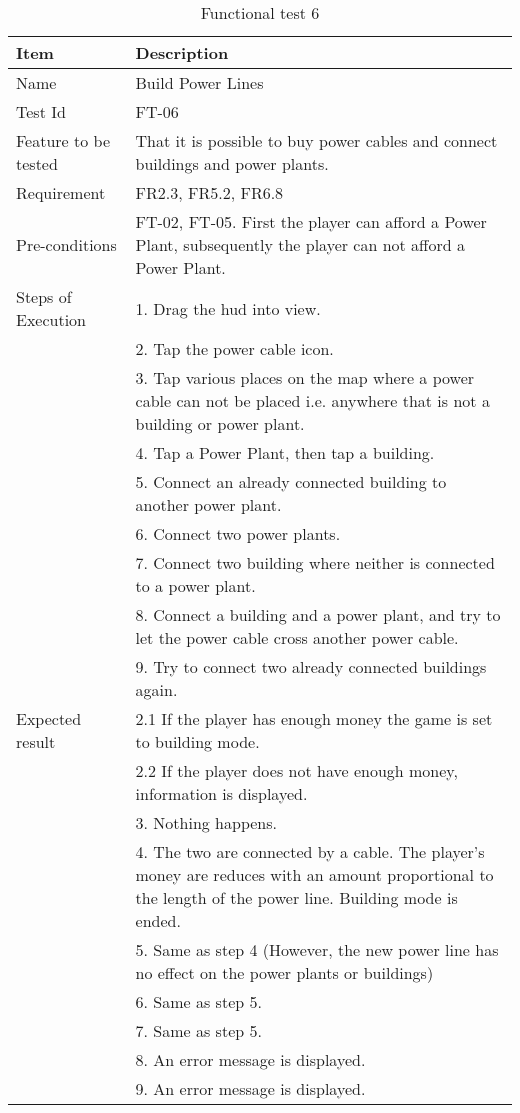 \begin{table}[H]
\centering
	\begin{tabular}{ l | p{8cm} }
		\hline
		{\bf Item} & {\bf Description} \\ \hline
		Name & Build Power Lines \\ 
		Test Id & FT-06 \\ 
		Feature to be tested &  That it is possible to buy power cables and connect buildings and power plants. \\ 
		Requirement & FR2.3, FR5.2, FR6.8 \\ 
		Pre-conditions & FT-02, FT-05. First the player can afford a Power Plant, subsequently the player can not afford a Power Plant.\\ 
		Steps of Execution & 1. Drag the hud into view. \\
		& 2. Tap the power cable icon. \\
		& 3. Tap various places on the map where a power cable can not be placed i.e. anywhere that is not a building or power plant. \\
		& 4. Tap a Power Plant, then tap a building. \\
		& 5. Connect an already connected building to another power plant. \\
		& 6. Connect two power plants. \\
		& 7. Connect two building where neither is connected to a power plant. \\
		& 8. Connect a building and a power plant, and try to let the power cable cross another power cable. \\
		& 9. Try to connect two already connected buildings again. \\
		Expected result & 2.1 If the player has enough money the game is set to building mode. \\
		& 2.2 If the player does not have enough money, information is displayed. \\
		& 3. Nothing happens. \\
		& 4. The two are connected by a cable. The player's money are reduces with an amount proportional to the length of the power line. Building mode is ended. \\
		& 5. Same as step 4 (However, the new power line has no effect on the power plants or buildings) \\
		& 6. Same as step 5. \\
		& 7. Same as step 5. \\
		& 8. An error message is displayed. \\
		& 9. An error message is displayed. \\
	\end{tabular}
	\caption{Functional test 6}
\end{table}

